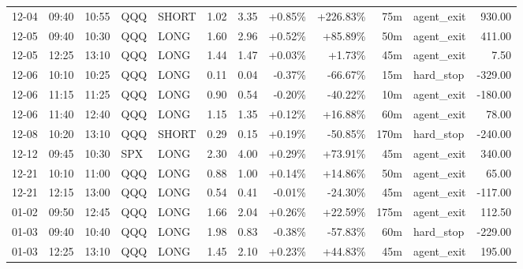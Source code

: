 \documentclass[11pt,a4paper,twoside]{article}
\begin{document}
\begin{center}
\begin{longtable}{>{\color{txtmain}}l l l l l r r r r r >{\color{txtmain}}l r}
12-04 & 09:40 & 10:55 & QQQ & SHORT & 1.02 & 3.35 & \textcolor{wingreen}{+0.85\%} & \textcolor{wingreen}{+226.83\%} & 75m & agent\_exit & \textcolor{wingreen}{930.00} \\
12-05 & 09:40 & 10:30 & QQQ & LONG & 1.60 & 2.96 & \textcolor{wingreen}{+0.52\%} & \textcolor{wingreen}{+85.89\%} & 50m & agent\_exit & \textcolor{wingreen}{411.00} \\
12-05 & 12:25 & 13:10 & QQQ & LONG & 1.44 & 1.47 & \textcolor{wingreen}{+0.03\%} & \textcolor{wingreen}{+1.73\%} & 45m & agent\_exit & \textcolor{wingreen}{7.50} \\
12-06 & 10:10 & 10:25 & QQQ & LONG & 0.11 & 0.04 & \textcolor{lossred}{-0.37\%} & \textcolor{lossred}{-66.67\%} & 15m & hard\_stop & \textcolor{lossred}{-329.00} \\
12-06 & 11:15 & 11:25 & QQQ & LONG & 0.90 & 0.54 & \textcolor{lossred}{-0.20\%} & \textcolor{lossred}{-40.22\%} & 10m & agent\_exit & \textcolor{lossred}{-180.00} \\
12-06 & 11:40 & 12:40 & QQQ & LONG & 1.15 & 1.35 & \textcolor{wingreen}{+0.12\%} & \textcolor{wingreen}{+16.88\%} & 60m & agent\_exit & \textcolor{wingreen}{78.00} \\
12-08 & 10:20 & 13:10 & QQQ & SHORT & 0.29 & 0.15 & \textcolor{wingreen}{+0.19\%} & \textcolor{lossred}{-50.85\%} & 170m & hard\_stop & \textcolor{lossred}{-240.00} \\
12-12 & 09:45 & 10:30 & SPX & LONG & 2.30 & 4.00 & \textcolor{wingreen}{+0.29\%} & \textcolor{wingreen}{+73.91\%} & 45m & agent\_exit & \textcolor{wingreen}{340.00} \\
12-21 & 10:10 & 11:00 & QQQ & LONG & 0.88 & 1.00 & \textcolor{wingreen}{+0.14\%} & \textcolor{wingreen}{+14.86\%} & 50m & agent\_exit & \textcolor{wingreen}{65.00} \\
12-21 & 12:15 & 13:00 & QQQ & LONG & 0.54 & 0.41 & \textcolor{lossred}{-0.01\%} & \textcolor{lossred}{-24.30\%} & 45m & agent\_exit & \textcolor{lossred}{-117.00} \\
01-02 & 09:50 & 12:45 & QQQ & LONG & 1.66 & 2.04 & \textcolor{wingreen}{+0.26\%} & \textcolor{wingreen}{+22.59\%} & 175m & agent\_exit & \textcolor{wingreen}{112.50} \\
01-03 & 09:40 & 10:40 & QQQ & LONG & 1.98 & 0.83 & \textcolor{lossred}{-0.38\%} & \textcolor{lossred}{-57.83\%} & 60m & hard\_stop & \textcolor{lossred}{-229.00} \\
01-03 & 12:25 & 13:10 & QQQ & LONG & 1.45 & 2.10 & \textcolor{wingreen}{+0.23\%} & \textcolor{wingreen}{+44.83\%} & 45m & agent\_exit & \textcolor{wingreen}{195.00} \\

\end{longtable}
\end{center}
\end{document}

